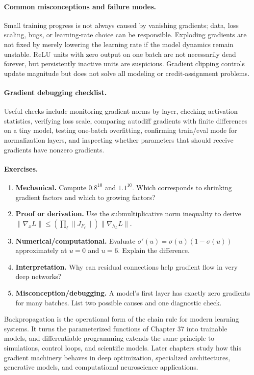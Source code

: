 \paragraph{Common misconceptions and failure modes.}
Small training progress is not always caused by vanishing gradients; data, loss scaling, bugs, or learning-rate choice can be responsible. Exploding gradients are not fixed by merely lowering the learning rate if the model dynamics remain unstable. ReLU units with zero output on one batch are not necessarily dead forever, but persistently inactive units are suspicious. Gradient clipping controls update magnitude but does not solve all modeling or credit-assignment problems.

\paragraph{Gradient debugging checklist.}
Useful checks include monitoring gradient norms by layer, checking activation statistics, verifying loss scale, comparing autodiff gradients with finite differences on a tiny model, testing one-batch overfitting, confirming train/eval mode for normalization layers, and inspecting whether parameters that should receive gradients have nonzero gradients.

\paragraph{Exercises.}
\begin{enumerate}[label=\textbf{38.4.\arabic*.}, leftmargin=*]
\item \textbf{Mechanical.} Compute \(0.8^{10}\) and \(1.1^{10}\). Which corresponds to shrinking gradient factors and which to growing factors?
\item \textbf{Proof or derivation.} Use the submultiplicative norm inequality to derive \(\|\nabla_xL\|\leq(\prod_\ell\|J_{F_\ell}\|)\|\nabla_{h_L}L\|\).
\item \textbf{Numerical/computational.} Evaluate \(\sigma'(u)=\sigma(u)(1-\sigma(u))\) approximately at \(u=0\) and \(u=6\). Explain the difference.
\item \textbf{Interpretation.} Why can residual connections help gradient flow in very deep networks?
\item \textbf{Misconception/debugging.} A model's first layer has exactly zero gradients for many batches. List two possible causes and one diagnostic check.
\end{enumerate}

Backpropagation is the operational form of the chain rule for modern learning systems. It turns the parameterized functions of Chapter 37 into trainable models, and differentiable programming extends the same principle to simulations, control loops, and scientific models. Later chapters study how this gradient machinery behaves in deep optimization, specialized architectures, generative models, and computational neuroscience applications.

\clearpage
